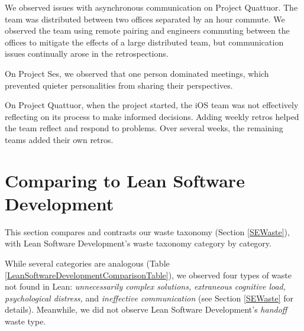 We observed issues with asynchronous communication on Project Quattuor. The team was distributed between two offices separated by an hour commute. We observed the team using remote pairing and engineers commuting between the offices to mitigate the effects of a large distributed team, but communication issues continually arose in the retrospections.

On Project Ses, we observed that one person dominated meetings, which prevented quieter personalities from sharing their perspectives. 

On Project Quattuor, when the project started, the iOS team was not effectively reflecting on its process to make informed decisions. Adding weekly retros helped the team reflect and respond to problems. Over several weeks, the remaining teams added their own retros. 










\section{Comparing to Lean Software Development}
\label{LeanSoftwareDevelopmentComparison}

This section compares and contrasts our waste taxonomy (Section \ref{SEWaste}), with Lean Software Development's waste taxonomy \cite{PoppendieckConceptToCash} category by category. 

While several categories are analogous (Table \ref{LeanSoftwareDevelopmentComparisonTable}), we observed four types of waste not found in Lean: \textit{unnecessarily complex solutions,} \textit{extraneous cognitive load,} \textit{psychological distress,} and \textit{ineffective communication} (see Section \ref{SEWaste} for details). Meanwhile, we did not observe Lean Software Development's \textit{handoff} waste type.


